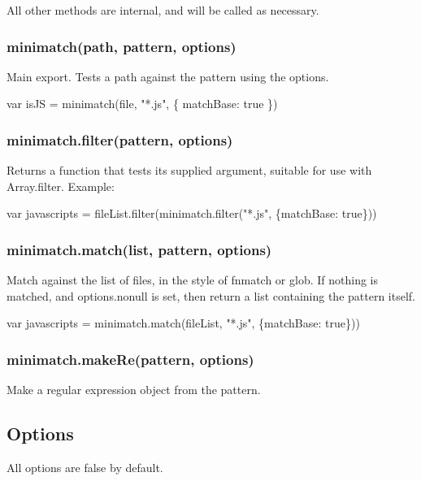 All other methods are internal, and will be called as necessary.

\subsubsection*{minimatch(path, pattern, options)}

Main export. Tests a path against the pattern using the options.


\begin{DoxyCode}
var isJS = minimatch(file, "*.js", \{ matchBase: true \})
\end{DoxyCode}


\subsubsection*{minimatch.\+filter(pattern, options)}

Returns a function that tests its supplied argument, suitable for use with {\ttfamily Array.\+filter}. Example\+:


\begin{DoxyCode}
var javascripts = fileList.filter(minimatch.filter("*.js", \{matchBase: true\}))
\end{DoxyCode}


\subsubsection*{minimatch.\+match(list, pattern, options)}

Match against the list of files, in the style of fnmatch or glob. If nothing is matched, and options.\+nonull is set, then return a list containing the pattern itself.


\begin{DoxyCode}
var javascripts = minimatch.match(fileList, "*.js", \{matchBase: true\}))
\end{DoxyCode}


\subsubsection*{minimatch.\+make\+Re(pattern, options)}

Make a regular expression object from the pattern.

\subsection*{Options}

All options are {\ttfamily false} by default.

